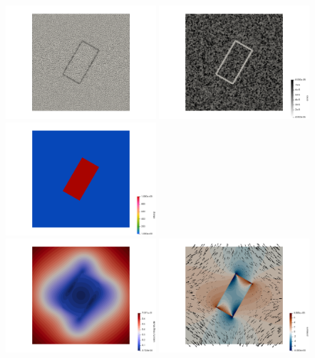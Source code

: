 \begin{center}
\includegraphics[width=5.57cm]{python_codes/fieldstone_142/results/case1/mesh}
\includegraphics[width=5.57cm]{python_codes/fieldstone_142/results/case1/areas}
\includegraphics[width=5.57cm]{python_codes/fieldstone_142/results/case1/eta}\\
\includegraphics[width=5.57cm]{python_codes/fieldstone_142/results/case1/vel1}
\includegraphics[width=5.57cm]{python_codes/fieldstone_142/results/case1/press1}

\end{center}
